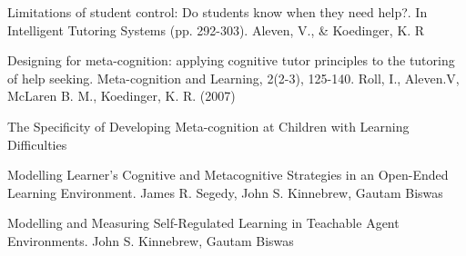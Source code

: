 \documentclass[11pt]{article}
\begin{document}
\begin{thebibliography}{9}

Limitations of student control: Do students know when they need help?. In Intelligent Tutoring Systems (pp. 292-303). Aleven, V., & Koedinger, K. R

Designing for meta-cognition: applying cognitive tutor principles to the tutoring of help seeking. Meta-cognition and Learning, 2(2-3), 125-140. Roll, I., Aleven.V, McLaren B. M., Koedinger, K. R. (2007)

The Specificity of Developing Meta-cognition at Children with Learning Difficulties 

Modelling Learner’s Cognitive and Metacognitive Strategies in an Open-Ended Learning Environment. James R. Segedy, John S. Kinnebrew, Gautam Biswas

Modelling and Measuring Self-Regulated Learning in Teachable Agent Environments. John S. Kinnebrew, Gautam Biswas


\end{thebibliography}
\end{document}
